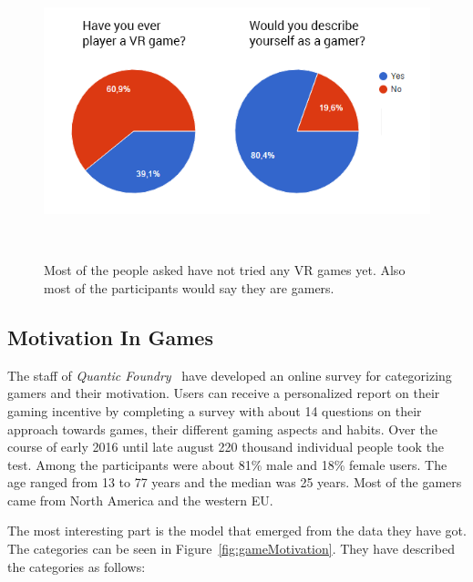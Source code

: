 \begin{figure}[h]
	\centering
	\includegraphics[width=0.90\columnwidth]{./figures/study}
	\caption[study]{Most of the people asked have not tried any VR games yet. Also most of the participants would say they are gamers.}~\label{fig:study}
\end{figure}

\subsection{Motivation In Games}

The staff of \textit{Quantic Foundry}~\cite{online:motivation}  have developed an online survey for categorizing 
gamers and their motivation.%
Users can receive a personalized report on their gaming incentive by completing a survey with about 14 questions on their approach towards games, their different gaming aspects and habits. \newline
Over the course of early 2016 until late august 220 thousand individual people took the test. Among the participants were about 81\% male and 18\% female users. The age ranged from 13 to 77 years and the median was 25 years. Most of the gamers came from North America and the western EU.

The most interesting part is the model that emerged from the data they have got. The categories can be seen in Figure~\ref{fig:gameMotivation}. They have described the categories as follows:

